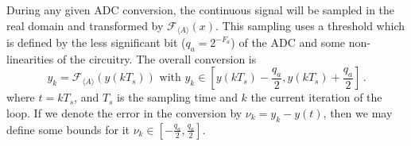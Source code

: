 \documentclass[a4paper,UKenglish]{lipics-v2018}
\newcommand{\mat}[1]{{#1}}
\renewcommand{\vec}[1]{{#1}}
\begin{document}
%

During any given ADC conversion, the continuous signal will be sampled in
the real domain and transformed by $\mathcal{F}_{\langle A \rangle} (x)$. 
This sampling uses a threshold which is defined by the less significant bit
($q_{a}=2^{-F_a}$) of the ADC and some non-linearities of the circuitry. 
The overall conversion is
%
$$\vec{y}_k=\mathcal{F}_{\langle A \rangle}\left(y(kT_s)\right)
  \text{ with }  \vec{y}_k \in \left[y(kT_s)-\frac{q_{a}}{2}, y(kT_s)+\frac{q_{a}}{2}\right] \,.$$
%
where $t = kT_s$, and $T_s$ is the sampling time and $k$ the current
iteration of the loop.  If we denote the error in the conversion by
$\nu_k=y_k-y(t)$, then we may define some bounds for it $\nu_k \in
[-\frac{q_{a}}{2}, \frac{q_{a}}{2}]$.
\end{document}
